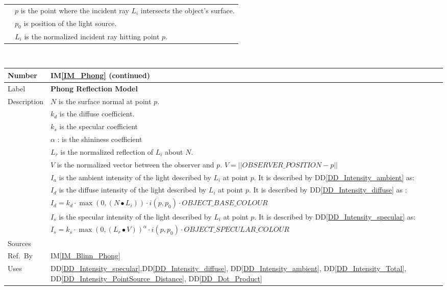 \documentclass[12pt]{article}
\newcommand{\colAwidth}{0.13\textwidth}
\newcommand{\colBwidth}{0.82\textwidth}
\newcommand{\ddref}[1]{DD\ref{#1}}
\newcommand{\iref}[1]{IM\ref{#1}}
\begin{document}
\begin{minipage}{\textwidth}
\begin{tabular}{| p{\colAwidth} | p{\colBwidth}|}
		& $p$ is the point where the incident ray $L_{i}$ intersects the 
		object's surface.\\
		& $p_{0}$ is position of the light source. \\				
		& $L_{i}$ is the normalized incident ray hitting point $p$.\\
		\hline
	\end{tabular}
\end{minipage}\\

\begin{minipage}{\textwidth}
	\renewcommand*{\arraystretch}{1.5}
	\begin{tabular}{| p{\colAwidth} | p{\colBwidth}|}
		\hline
		\rowcolor[gray]{0.9}
		Number& \iref{IM_Phong} (continued)\\
		\hline
		Label& \bf Phong Reflection Model\\
		\hline
		Description & $N$ is the surface normal at point 
		$p$.\\
		& $k_{d}$ is the diffuse coefficient.\\
		& $k_{s}$ is the specular coefficient\\
		& $\alpha$ : is the shininess coefficient\\		
		& $L_{r}$ is the normalized reflection of $L_{i}$ about $N$.\\
		& $V$ is the normalized vector between the observer and $p$. $V = 
		||OBSERVER\_POSITION - p||$\\
		& $I_{a}$ is the ambient intensity of the light described by 
		$L_{i}$ at point $p$. It is described by 
		\ddref{DD_Intensity_ambient} as:\\
		& $I_{d}$ is the diffuse intensity of the light described by 
		$L_{i}$ at point $p$. It is described by 
		\ddref{DD_Intensity_diffuse} as : \\
		& $I_{d} = k_{d} \cdot \max(0, (N \bullet 
		L_{i}))\cdot i(p,p_{0}) \cdot OBJECT\_BASE\_COLOUR$ \\
		& $I_{s}$ is the specular intensity of the light described by 
		$L_{i}$ at point $p$. It is described by 
		\ddref{DD_Intensity_specular} as: \\
		& $I_{s} = k_{s} \cdot \max(0, (L_{r} \bullet V))^\alpha \cdot
		i(p,p_{0})\cdot OBJECT\_SPECULAR\_COLOUR$ \\
		\hline
		Sources& \cite{Comninos2005,Lengyel2003,shreiner2012} \\
		\hline
		Ref.\ By & \iref{IM_Blinn_Phong}\\
		\hline
		Uses & \ddref{DD_Intensity_specular},\ddref{DD_Intensity_diffuse}, 
		\ddref{DD_Intensity_ambient}, \ddref{DD_Intensity_Total}, 
		\ddref{DD_Intensity_PointSource_Distance}, \ddref{DD_Dot_Product} \\
		\hline
	\end{tabular}
\end{minipage}\\
\end{document}
